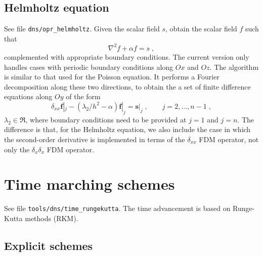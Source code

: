 {\subsection{Helmholtz equation}

See file {\tt dns/opr\_helmholtz}. Given the scalar field $s$, obtain the scalar
field $f$ such that
\begin{equation}
\nabla^2 f + \alpha f= s \;,
\end{equation}
complemented with appropriate boundary conditions. The current version only
handles cases with periodic boundary conditions along $Ox$ and $Oz$. The
algorithm is similar to that used for the Poisson equation. It performs a
Fourier decomposition along these two directions, to obtain the a set of finite
difference equations along $Oy$ of the form
\begin{equation}
  \delta_{xx} \mathbf{f}|_j - (\lambda_2/h^2-\alpha)\mathbf{f}|_j=\mathbf{s}|_j 
  \;,\qquad j=2,\ldots,n-1 \;,
\end{equation}
$\lambda_2\in\Re$, where boundary conditions need to be provided at $j=1$ and
$j=n$. The difference is that, for the Helmholtz equation, we also include the
case in which the second-order derivative is implemented in terms of the
$\delta_{xx}$ FDM operator, not only the $\delta_x\delta_x$ FDM operator.

\section{Time marching schemes}

See file {\tt tools/dns/time\_rungekutta}. The time advancement is based on
Runge-Kutta methods (RKM).

\subsection{Explicit schemes}

}
